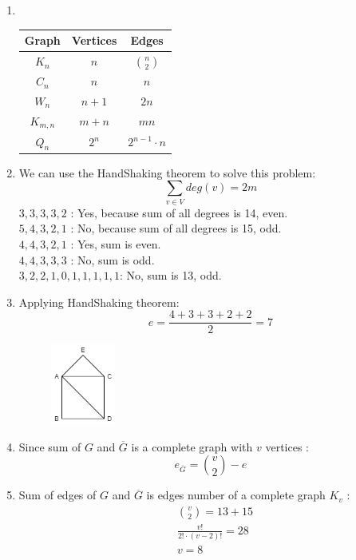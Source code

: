 \documentclass[a4paper]{article}
\begin{document}
	\begin{enumerate}
	    \item \phantom{New line}\\
	    \begin{tabular}{c|c|c}
	         Graph & Vertices & Edges  \\
	         \hline
	         $K_n$  & $n$ & ${n\choose 2}$ \\
	         \hline
	         $C_n$ & $n$ & $n$ \\
	         \hline
	         $W_n$ & $n+1$ & $2n$ \\
	         \hline
	         $K_{m,n}$ & $m+n$ & $mn$ \\ 
	         \hline
	         $Q_n$ & $2^{n}$ & $2^{n-1}\cdot n$ \\
	    \end{tabular}
	    \item 
	    We can use the HandShaking theorem to solve this problem:
	    \begin{equation*}
	        \sum_{v \in V} deg(v) = 2m
	    \end{equation*}
	    $3,3,3,3,2$ : Yes, because sum of all degrees is 14, even. \\
	    $5,4,3,2,1$ : No, because sum of all degrees is 15, odd. \\
	    $4,4,3,2,1$ : Yes, sum is even. \\
	    $4,4,3,3,3$ : No, sum is odd. \\
	    $3,2,2,1,0,1,1,1,1,1$: No, sum is 13, odd.

	\item Applying HandShaking theorem:
	\begin{equation*}
	    e = \frac{4+3+3+2+2}{2} = 7 
	\end{equation*}
	\begin{figure}[H]
	    \centering
	    \includegraphics[width=0.2\textwidth]{gprob2.png}
	\end{figure}
	\item Since sum of $G$ and $\overline{G}$ is a complete graph with $v$ vertices :
	\begin{equation*}
	    e_{ \overline{G}} = {v \choose 2} - e
	\end{equation*}
	\item Sum of edges of $G$ and $\overline{G}$ is edges number of a complete graph $K_v$ :
	\begin{align*}
	    &{v \choose 2} = 13 + 15 \\
	    &\frac{v!}{2!\cdot (v-2)!} = 28 \\
	    &v = 8
	\end{align*}
    \end{enumerate}	
\end{document}
